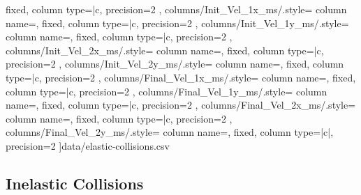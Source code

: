\begin{table}[H]
{{            fixed,
            column type={|c},
            precision=2
        },
        columns/Init_Vel_1x_ms/.style={
            column name={},
            fixed,
            column type={|c},
            precision=2
        },
        columns/Init_Vel_1y_ms/.style={
            column name={},
            fixed,
            column type={|c},
            precision=2
        },
        columns/Init_Vel_2x_ms/.style={
            column name={},
            fixed,
            column type={|c},
            precision=2
        },
        columns/Init_Vel_2y_ms/.style={
            column name={},
            fixed,
            column type={|c},
            precision=2
        },
        columns/Final_Vel_1x_ms/.style={
            column name={},
            fixed,
            column type={|c},
            precision=2
        },
        columns/Final_Vel_1y_ms/.style={
            column name={},
            fixed,
            column type={|c},
            precision=2
        },
        columns/Final_Vel_2x_ms/.style={
            column name={},
            fixed,
            column type={|c},
            precision=2
        },
        columns/Final_Vel_2y_ms/.style={
            column name={},
            fixed,
            column type={|c|},
            precision=2
        }
    ]{data/elastic-collisions.csv}
}
\end{table}

\subsection{Inelastic Collisions}

